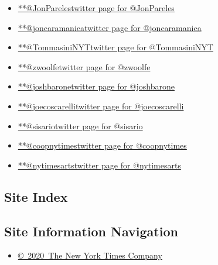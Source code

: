 \begin{itemize}
\tightlist
\item
  \href{https://twitter.com/JonPareles}{**@JonParelestwitter page for
  @JonPareles}
\item
  \href{https://twitter.com/joncaramanica}{**@joncaramanicatwitter page
  for @joncaramanica}
\item
  \href{https://twitter.com/TommasiniNYT}{**@TommasiniNYTtwitter page
  for @TommasiniNYT}
\item
  \href{https://twitter.com/zwoolfe}{**@zwoolfetwitter page for
  @zwoolfe}
\item
  \href{https://twitter.com/joshbarone}{**@joshbaronetwitter page for
  @joshbarone}
\item
  \href{https://twitter.com/joecoscarelli}{**@joecoscarellitwitter page
  for @joecoscarelli}
\item
  \href{https://twitter.com/sisario}{**@sisariotwitter page for
  @sisario}
\item
  \href{https://twitter.com/coopnytimes}{**@coopnytimestwitter page for
  @coopnytimes}
\item
  \href{https://twitter.com/nytimesarts}{**@nytimesartstwitter page for
  @nytimesarts}
\end{itemize}

\hypertarget{site-index}{%
\subsection{Site Index}\label{site-index}}

\hypertarget{site-information-navigation}{%
\subsection{Site Information
Navigation}\label{site-information-navigation}}

\begin{itemize}
\tightlist
\item
  \href{https://help.nytimes3xbfgragh.onion/hc/en-us/articles/115014792127-Copyright-notice}{©~2020~The
  New York Times Company}
\end{itemize}

